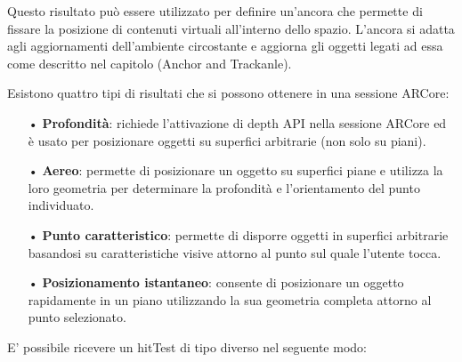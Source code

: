 \documentclass[crop=false, class=book]{standalone}
\begin{document}
	\begin{flushleft}
	Questo risultato può essere utilizzato per definire un'ancora che permette di fissare la posizione di 							contenuti virtuali all'interno dello spazio. L'ancora si adatta agli aggiornamenti dell'ambiente circostante e aggiorna gli 	oggetti legati ad essa come descritto nel capitolo (Anchor and Trackanle).\\
	\end{flushleft}	
		Esistono quattro tipi di risultati che si possono ottenere in una sessione ARCore:
		\begin{itemize}
		\item[•] \textbf{Profondità}: richiede l'attivazione di depth API nella sessione ARCore ed è usato per posizionare oggetti su superfici arbitrarie (non solo su piani).
		\item[•]\textbf{Aereo}: permette di posizionare un oggetto su superfici piane e utilizza la loro geometria per determinare la profondità e l'orientamento del punto individuato.
		\item[•] \textbf{Punto caratteristico}: permette di disporre oggetti in superfici arbitrarie basandosi su caratteristiche visive attorno al punto sul quale l'utente tocca. 
		\item[•] \textbf{Posizionamento istantaneo}: consente di posizionare un oggetto rapidamente in un piano utilizzando la sua geometria completa attorno al punto selezionato. 
	\end{itemize}
	\clearpage
	E' possibile ricevere un hitTest di tipo diverso nel seguente modo:
\end{document}
